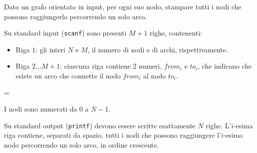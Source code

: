 \usepackage{xcolor}
\usepackage{afterpage}
\usepackage{pifont,mdframed}
\usepackage[bottom]{footmisc}


\renewcommand{\inputfile}{\texttt{stdin}}
\renewcommand{\outputfile}{\texttt{stdout}}
\makeatletter
\renewcommand{\this@inputfilename}{\texttt{stdin}}
\renewcommand{\this@outputfilename}{\texttt{stdout}}
\makeatother


\newenvironment{warning}
  {\par\begin{mdframed}[linewidth=2pt,linecolor=gray]%
    \begin{list}{}{\leftmargin=1cm
                   \labelwidth=\leftmargin}\item[\Large\ding{43}]}
  {\end{list}\end{mdframed}\par}


  Dato un grafo orientato in input, per ogni suo nodo, stampare tutti i nodi che
possono raggiungerlo percorrendo un solo arco.



\InputFile
Su standard input (\texttt{scanf}) sono presenti $M+1$ righe, contenenti:
\begin{itemize}[nolistsep,itemsep=2mm]
\item Riga $1$: gli interi $N$ e $M$, il numero di nodi e di archi, rispettivamente.
\item Riga $2\dots M+1$: ciascuna riga contiene $2$ numeri, $from_i$ e $to_i$,
che indicano che esiste un arco che connette il nodo $from_i$ al nodo $to_i$.
\end{itemize}
\begin{warning} 
    I nodi sono numerati da $0$ a $N-1$.
\end{warning}

\OutputFile
Su standard output (\texttt{printf}) devono essere scritte esattamente $N$ righe.
L'$i$-esima riga contiene, separati da spazio, tutti i nodi che possono raggiungere
l'$i$-esimo nodo percorrendo un solo arco, in ordine crescente.
	
